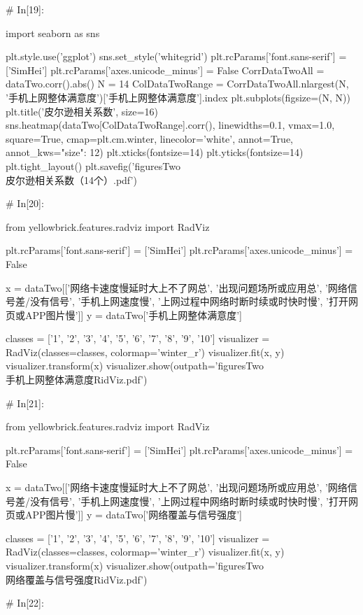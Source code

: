 \documentclass{MathorCupmodeling}
\begin{document}
\begin{python}
	# In[19]:
	
	
	import seaborn as sns
	
	plt.style.use('ggplot')
	sns.set_style('whitegrid')
	plt.rcParams['font.sans-serif'] = ['SimHei']
	plt.rcParams['axes.unicode_minus'] = False
	CorrDataTwoAll = dataTwo.corr().abs()
	N = 14
	ColDataTwoRange = CorrDataTwoAll.nlargest(N, '手机上网整体满意度')['手机上网整体满意度'].index
	plt.subplots(figsize=(N, N))
	plt.title('皮尔逊相关系数', size=16)
	sns.heatmap(dataTwo[ColDataTwoRange].corr(),
				linewidths=0.1,
				vmax=1.0,
				square=True,
				cmap=plt.cm.winter,
				linecolor='white',
				annot=True,
				annot_kws={"size": 12})
	plt.xticks(fontsize=14)
	plt.yticks(fontsize=14)
	plt.tight_layout()
	plt.savefig('figuresTwo\\[附件2]皮尔逊相关系数（14个）.pdf')
	
	# In[20]:
	
	
	from yellowbrick.features.radviz import RadViz
	
	plt.rcParams['font.sans-serif'] = ['SimHei']
	plt.rcParams['axes.unicode_minus'] = False
	
	x = dataTwo[['网络卡速度慢延时大上不了网总', '出现问题场所或应用总', '网络信号差/没有信号', '手机上网速度慢', '上网过程中网络时断时续或时快时慢', '打开网页或APP图片慢']]
	y = dataTwo['手机上网整体满意度']
	
	classes = ['1', '2', '3', '4', '5', '6', '7', '8', '9', '10']
	visualizer = RadViz(classes=classes, colormap='winter_r')
	visualizer.fit(x, y)
	visualizer.transform(x)
	visualizer.show(outpath='figuresTwo\\[附件2]手机上网整体满意度RidViz.pdf')
	
	# In[21]:
	
	
	from yellowbrick.features.radviz import RadViz
	
	plt.rcParams['font.sans-serif'] = ['SimHei']
	plt.rcParams['axes.unicode_minus'] = False
	
	x = dataTwo[['网络卡速度慢延时大上不了网总', '出现问题场所或应用总', '网络信号差/没有信号', '手机上网速度慢', '上网过程中网络时断时续或时快时慢', '打开网页或APP图片慢']]
	y = dataTwo['网络覆盖与信号强度']
	
	classes = ['1', '2', '3', '4', '5', '6', '7', '8', '9', '10']
	visualizer = RadViz(classes=classes, colormap='winter_r')
	visualizer.fit(x, y)
	visualizer.transform(x)
	visualizer.show(outpath='figuresTwo\\[附件2]网络覆盖与信号强度RidViz.pdf')
	
	# In[22]:
	

\end{python}
\end{document}
